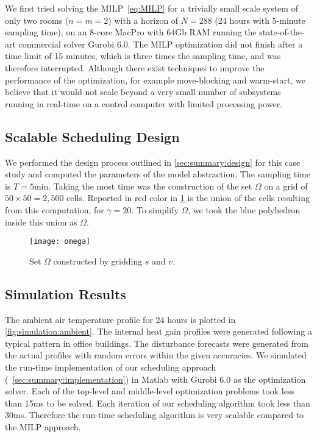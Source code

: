 We first tried solving the MILP~\eqref{eq:MILP} for a trivially small scale system of only two rooms ($n=m=2$) with a horizon of $N=288$ (24 hours with 5-minute sampling time), on an 8-core MacPro with 64Gb RAM running the state-of-the-art commercial solver Gurobi 6.0.
The MILP optimization did not finish after a time limit of 15 minutes, which is three times the sampling time, and was therefore interrupted.
Although there exist techniques to improve the performance of the optimization, for example move-blocking and warm-start, we believe that it would not scale beyond a very small number of subsystems running in real-time on a control computer with limited processing power.

\subsection{Scalable Scheduling Design}
\label{sec:simulation:design}

We performed the design process outlined in \cref{sec:summary:design} for this case study and computed the parameters of the model abstraction.
The sampling time is $T = 5 \text{min}$.
Taking the most time was the construction of the set $\Omega$ on a grid of $50 \times 50 = 2\comma 500$ cells.
Reported in red color in \cref{fig:simulation:omega} is the union of the cells resulting from this computation, for $\gamma = 20$.
To simplify $\Omega$, we took the blue polyhedron inside this union as $\Omega$.

\begin{figure}[tb]
  \centering
  \texttt{[image: omega]}
 \vspace{-8pt}
  \caption{Set $\Omega$ constructed by gridding $s$ and $v$.}
    \vspace{-8pt}
  \label{fig:simulation:omega}
\end{figure}


\subsection{Simulation Results}
\label{sec:simulation:results}

The ambient air temperature profile for 24 hours is plotted in \cref{fig:simulation:ambient}.
The internal heat gain profiles were generated following a typical pattern in office buildings.
The disturbance forecasts were generated from the actual profiles with random errors within the given accuracies.
We simulated the run-time implementation of our scheduling approach (~\cref{sec:summary:implementation}) in Matlab with Gurobi 6.0 as the optimization solver.
Each of the top-level and middle-level optimization problems took less than 15ms to be solved.
Each iteration of our scheduling algorithm took less than 30ms.
Therefore the run-time scheduling algorithm is very scalable compared to the MILP approach.

